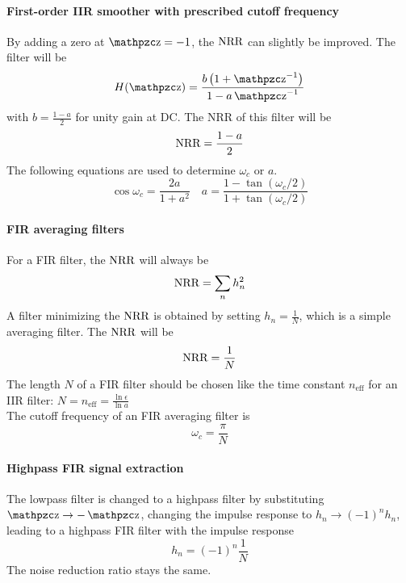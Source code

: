 \paragraph{First-order IIR smoother with prescribed cutoff frequency}
By adding a zero at $\z=-1$, the $\operatorname{\text{NRR}}$ can slightly be improved. 
The filter will be
\begin{equation*}
	H(\z) = \frac{b \left( 1 + \z^{-1} \right)}{1 - a \z^{-1}}
\end{equation*}
with $b = \frac{1-a}{2}$ for unity gain at DC. The NRR of this filter will be
\begin{equation*}
	\operatorname{\text{NRR}} = \frac{1-a}{2}
\end{equation*}
The following equations are used to determine $\omega_c$ or $a$.
\begin{equation*}
	\cos \omega_c = \frac{2 a}{1+a^2} \quad a = \frac{1-\tan(\omega_c/2)}{1+\tan(\omega_c/2)}
\end{equation*}

\paragraph{FIR averaging filters}
For a FIR filter, the $\operatorname{\text{NRR}}$ will always be
\begin{equation*}
	\operatorname{\text{NRR}} = \sum\limits_n h_n^2
\end{equation*}
A filter minimizing the $\operatorname{\text{NRR}}$ is obtained by setting $h_n = \frac{1}{N}$, which is a simple averaging filter. The $\operatorname{\text{NRR}}$ will be
\begin{equation*}
	\operatorname{\text{NRR}} = \frac{1}{N}
\end{equation*}
The length $N$ of a FIR filter should be chosen like the time constant
$n_{\text{eff}}$ for an IIR filter: 
$N = n_{\text{eff}} = \frac{\ln \epsilon}{\ln a}$ \\

The cutoff frequency of an FIR averaging filter is
\begin{equation*}
	\omega_c = \frac{\pi}{N}
\end{equation*}

\paragraph{Highpass FIR signal extraction}
The lowpass filter is changed to a highpass filter by substituting $\z \to -\z$,
changing the impulse response to $h_n \to (-1)^n h_n$, leading to
a highpass FIR filter with the impulse response
\begin{equation*}
	h_n = (-1)^n \frac{1}{N}
\end{equation*}
The noise reduction ratio stays the same.

